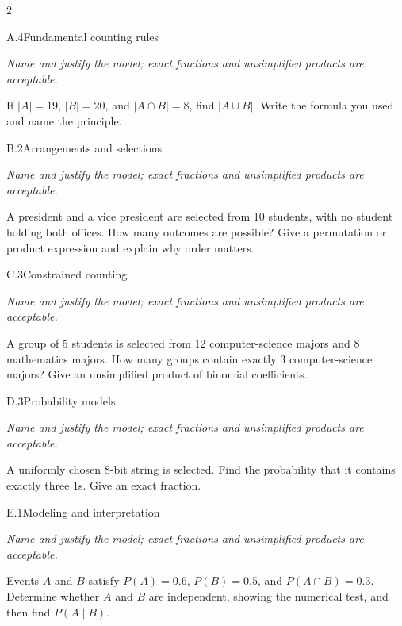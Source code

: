 \documentclass[9pt]{extarticle}
\begin{document}
\CoreWorkArea
\FormBreak
{}
\begin{multicols}{2}
\begin{CoreProblem}{A.4}{Fundamental counting rules}
{\scriptsize\textit{Name and justify the model; exact fractions and unsimplified products are acceptable.}\par}
If $|A|=19$, $|B|=20$, and $|A\cap B|=8$, find $|A\cup B|$. Write
    the formula you used and name the principle.
\end{CoreProblem}
\begin{CoreProblem}{B.2}{Arrangements and selections}
{\scriptsize\textit{Name and justify the model; exact fractions and unsimplified products are acceptable.}\par}
A president and a vice president are selected from 10 students, with
    no student holding both offices. How many outcomes are possible? Give a
    permutation or product expression and explain why order matters.
\end{CoreProblem}
\begin{CoreProblem}{C.3}{Constrained counting}
{\scriptsize\textit{Name and justify the model; exact fractions and unsimplified products are acceptable.}\par}
A group of 5 students is selected from 12 computer-science majors and
    8 mathematics majors. How many groups contain exactly 3 computer-science
    majors? Give an unsimplified product of binomial coefficients.
\end{CoreProblem}
\columnbreak
\begin{CoreProblem}{D.3}{Probability models}
{\scriptsize\textit{Name and justify the model; exact fractions and unsimplified products are acceptable.}\par}
A uniformly chosen 8-bit string is selected. Find the probability
    that it contains exactly three $1$s. Give an exact fraction.
\end{CoreProblem}
\begin{CoreProblem}{E.1}{Modeling and interpretation}
{\scriptsize\textit{Name and justify the model; exact fractions and unsimplified products are acceptable.}\par}
Events $A$ and $B$ satisfy $P(A)=0.6$, $P(B)=0.5$, and
    $P(A\cap B)=0.3$. Determine whether $A$ and $B$ are independent, showing
    the numerical test, and then find $P(A\mid B)$.
\end{CoreProblem}
\end{multicols}
\CoreWorkArea
\FormBreak
{}
\end{document}
